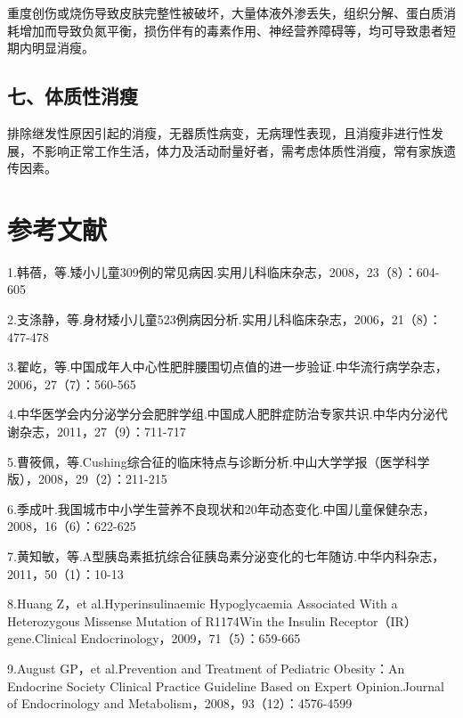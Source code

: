 重度创伤或烧伤导致皮肤完整性被破坏，大量体液外渗丢失，组织分解、蛋白质消耗增加而导致负氮平衡，损伤伴有的毒素作用、神经营养障碍等，均可导致患者短期内明显消瘦。

\subsection{七、体质性消瘦}

排除继发性原因引起的消瘦，无器质性病变，无病理性表现，且消瘦非进行性发展，不影响正常工作生活，体力及活动耐量好者，需考虑体质性消瘦，常有家族遗传因素。

\protect\hypertarget{text00316.html}{}{}

\section{参考文献}

1.韩蓓，等.矮小儿童309例的常见病因.实用儿科临床杂志，2008，23（8）：604-605

2.支涤静，等.身材矮小儿童523例病因分析.实用儿科临床杂志，2006，21（8）：477-478

3.翟屹，等.中国成年人中心性肥胖腰围切点值的进一步验证.中华流行病学杂志，2006，27（7）：560-565

4.中华医学会内分泌学分会肥胖学组.中国成人肥胖症防治专家共识.中华内分泌代谢杂志，2011，27（9）：711-717

5.曹筱佩，等.Cushing综合征的临床特点与诊断分析.中山大学学报（医学科学版），2008，29（2）：211-215

6.季成叶.我国城市中小学生营养不良现状和20年动态变化.中国儿童保健杂志，2008，16（6）：622-625

7.黄知敏，等.A型胰岛素抵抗综合征胰岛素分泌变化的七年随访.中华内科杂志，2011，50（1）：10-13

8.Huang Z，et al.Hyperinsulinaemic Hypoglycaemia Associated With a
Heterozygous Missense Mutation of R1174Win the Insulin
Receptor（IR）gene.Clinical Endocrinology，2009，71（5）：659-665

9.August GP，et al.Prevention and Treatment of Pediatric Obesity：An
Endocrine Society Clinical Practice Guideline Based on Expert
Opinion.Journal of Endocrinology and
Metabolism，2008，93（12）：4576-4599

\protect\hypertarget{text00317.html}{}{}

